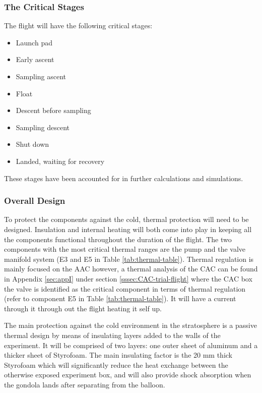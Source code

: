 \subsubsection{The Critical Stages}
The flight will have the following critical stages:
\begin{itemize}
    \item Launch pad
    \item Early ascent
    \item Sampling ascent
    \item Float
    \item Descent before sampling
    \item Sampling descent
    \item Shut down
    \item Landed, waiting for recovery
\end{itemize}
These stages have been accounted for in further calculations and simulations.

\subsubsection{Overall Design}
To protect the components against the cold, thermal protection will need to be designed. Insulation and internal heating will both come into play in keeping all the components functional throughout the duration of the flight. The two components with the most critical thermal ranges are the pump and the valve manifold system (E3 and E5 in Table \ref{tab:thermal-table}). Thermal regulation is mainly focused on the AAC however, a thermal analysis of the CAC can be found in Appendix \ref{sec:appI} under section \ref{sssec:CAC-trial-flight} where the  CAC box the valve is identified as the critical component in terms of thermal regulation (refer to component E5 in Table \ref{tab:thermal-table}). It will have a current through it through out the flight heating it self up.

The main protection against the cold environment in the stratosphere is a passive thermal design by means of  insulating layers added to the walls of the experiment. It will be comprised of two layers: one outer sheet of aluminum and a thicker sheet of Styrofoam. The main insulating factor is the 20 mm thick Styrofoam which will significantly reduce the heat exchange between the otherwise exposed experiment box, and will also provide shock absorption when the gondola lands after separating from the balloon.

